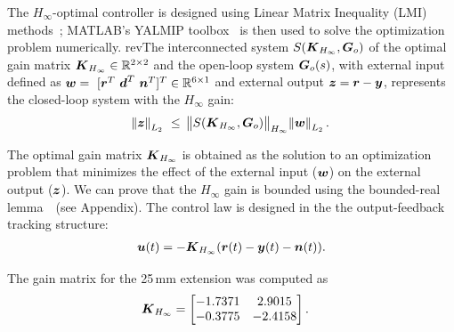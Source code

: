 The $H_\infty$-optimal controller is designed using Linear Matrix Inequality (LMI) methods~\cite{Duan2013a,Boyd1994}; MATLAB's YALMIP toolbox~\cite{Lofberg2004} is then used to solve the optimization problem numerically. rev{The interconnected system $S(\boldsymbol{K}_{H_{\infty}},\boldsymbol{G}_o)$ of the optimal gain matrix $\boldsymbol{K}_{H_{\infty}}\in \mathbb{R}^{2\times2}$ and the open-loop system $\boldsymbol{G}_o(s)$, with external input defined as $\boldsymbol{w}=~[\boldsymbol{r}^T~\boldsymbol{d}^T~\boldsymbol{n}^T]^T \in \mathbb{R}^{6\times1}$ and external output $\boldsymbol{z}=\boldsymbol{r}-\boldsymbol{y}$, represents the closed-loop system with the ${H_{\infty}}$ gain:} \vspace{2mm}
\begin{align}
\norm{\boldsymbol{z}}_{L_2} ~\leq~ \norm{S(\boldsymbol{K}_{H_{\infty}},\boldsymbol{G}_o)}_{H_{\infty}} \norm{\boldsymbol{w}}_{L_2}.
\end{align}

The optimal gain matrix $\boldsymbol{K}_{H_{\infty}}$ is obtained as the solution to an optimization problem that minimizes the effect of the external input ($\boldsymbol{w}$) on the external output ($\boldsymbol{z}$). We can prove that the ${H_{\infty}}$ gain is bounded using the bounded-real lemma~\cite{Boyd1994}~(see Appendix). The control law is designed in the the output-feedback tracking structure: \vspace{2mm}
\begin{align}
\boldsymbol{u}(t)=-\boldsymbol{K}_{H_\infty}(\boldsymbol{r}(t)-\boldsymbol{y}(t)-\boldsymbol{n}(t)). \label{eq:Hinf-ctl}
\end{align}

The gain matrix for the 25\,mm extension %
was computed as \vspace{2mm}
\begin{align*}
\boldsymbol{K}_{H_{\infty}} &=\begin{bmatrix}  
           -1.7371  &  2.9015 \\
           -0.3775  & -2.4158  
    \end{bmatrix}.
\end{align*}


